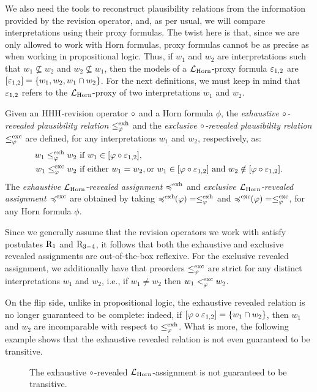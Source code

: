 We also need the tools to reconstruct plausibility relations 
from the information provided by the revision operator,
and, as per usual, we will compare interpretations using their proxy formulas.
The twist here is that, since we are only allowed to work with Horn formulas, proxy formulas 
cannot be as precise as when working in propositional logic.
Thus, if $w_1$ and $w_2$ are interpretations such that $w_1\not\subseteq w_2$
and $w_2\not\subseteq w_1$, then the models of a $\mathcal{L}_{\mathrm{Horn}}$-proxy formula $\varepsilon_{1,2}$
are $[\varepsilon_{1,2}]=\{w_1,w_2,w_1\cap w_2\}$.
For the next definitions, we must keep in mind that $\varepsilon_{1,2}$ refers
to the $\mathcal{L}_{\mathrm{Horn}}$-proxy of two interpretations $w_1$ and $w_2$.

Given an ${\mathrm{HHH}}$-revision operator $\circ$ and a Horn formula $\phi$,
the \emph{exhaustive $\circ$-revealed plausibility relation $\le^{\operatorname{exh}}_\varphi$} 
and the \emph{exclusive $\circ$-revealed plausibility relation $\le^{\operatorname{exc}}_\varphi$} 
are defined, for any interpretations $w_1$ and $w_2$, respectively, as:
\begin{align*}
	w_1\le^{\operatorname{exh}}_\varphi w_2 &~\text{if}~w_1\in[\varphi\circ\varepsilon_{1,2}],\\
	w_1\le^{\operatorname{exc}}_\varphi w_2 &~\text{if either}~w_1=w_2,
			\text{or}~w_1\in[\varphi\circ\varepsilon_{1,2}]~\text{and}~w_2\notin[\varphi\circ\varepsilon_{1,2}].
\end{align*}
The \emph{exhaustive $\mathcal{L}_{\mathrm{Horn}}$-revealed assignment $\preccurlyeq^{\operatorname{exh}}$} 
and \emph{exclusive $\mathcal{L}_{\mathrm{Horn}}$-revealed assignment $\preccurlyeq^{\operatorname{exc}}$} are obtained
by taking $\preccurlyeq^{\operatorname{exh}}\!\!(\varphi)=\le^{\operatorname{exh}}_\varphi$ and $\preccurlyeq^{\operatorname{exc}}\!\!(\varphi)=\le^{\operatorname{exc}}_\varphi$, 
for any Horn formula $\phi$.

Since we generally assume that the revision operators we work with 
satisfy postulates $\mathrm{R}_{1}$ and $\mathrm{R}_{3-4}$,
it follows that both the exhaustive and exclusive revealed assignments 
are out-of-the-box reflexive.
For the exclusive revealed assignment,
we additionally have that preorders $\le^{{\operatorname{exc}}}_{\varphi}$ are 
strict for any distinct interpretations $w_1$ and $w_2$,
i.e., if $w_1\neq w_2$ then $w_1 <^{{\operatorname{exc}}}_{\varphi} w_2$.

On the flip side, unlike in propositional logic,
the exhaustive revealed relation is no longer guaranteed to
be complete: 
indeed, if $[\varphi\circ \varepsilon_{1,2}]=\{w_1\cap w_2\}$,
then $w_1$ and $w_2$ are incomparable with respect to $\le^{{\operatorname{exh}}}_{\varphi}$.
What is more, the following example shows that the 
exhaustive revealed relation is not even guaranteed to be transitive.

\begin{figure}\centering
	\caption{
		The exhaustive $\circ$-revealed $\mathcal{L}_{\mathrm{Horn}}$-assignment 
		is not guaranteed to be transitive.
	}
	\label{fig:6-hhh-revision-exhaustive-revealed-not-transitive}
\end{figure}

